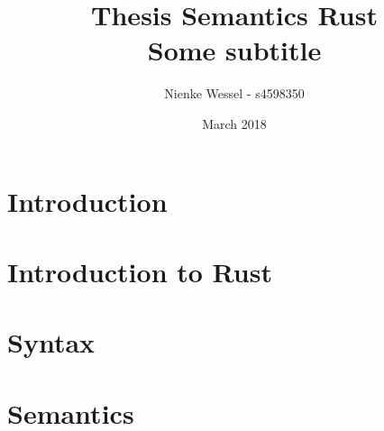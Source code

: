 \documentclass{report}
\title{Thesis Semantics Rust\\ \large Some subtitle}
\author{Nienke Wessel - s4598350 }
\date{March 2018}
\begin{document}
\maketitle

%

\tableofcontents

\chapter*{Introduction}


\chapter{Introduction to Rust}


\chapter{Syntax}


\chapter{Semantics}


%

%

%
\end{document}
